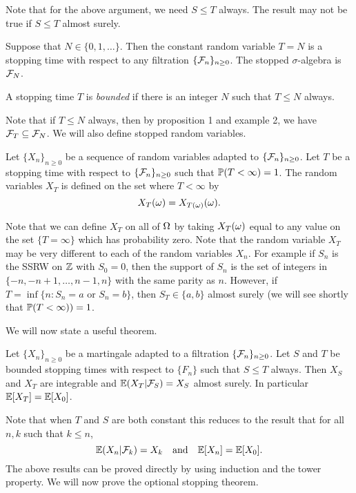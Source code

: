 Note that for the above argument, we need $S \le T$ always. The result may not be true if $S \le T$ almost surely.
\begin{example}
    Suppose that $N \in \{0,1,\ldots\}$. Then the constant random variable $T=N$ is a stopping time with respect to any filtration $\{{\mathcal{F}}_n\}_{n \ge 0}$. The stopped $\sigma$-algebra is ${\mathcal{F}}_N$. 
\end{example}
\begin{definition}
    A stopping time $T$ is \emph{bounded} if there is an integer $N$ such that $T \le N$ always.
\end{definition}
Note that if $T \le N$ always, then by proposition 1 and example 2, we have ${\mathcal{F}}_T \subseteq {\mathcal{F}}_N$. We will also define stopped random variables.
\begin{definition}
    Let $\{X_n\}_{n \ge 0}$ be a sequence of random variables adapted to $\{{\mathcal{F}}_n\}_{n \ge 0}$. Let $T$ be a stopping time with respect to $\{{\mathcal{F}}_n\}_{n \ge 0}$ such that ${\mathbb{P}}(T < \infty) = 1$. The random variables $X_T$ is defined on the set where $T < \infty$ by
    \[X_T({\omega})=X_{T({\omega})}({\omega}).\]
\end{definition}
Note that we can define $X_T$ on all of ${{\Omega}}$ by taking $X_T({\omega})$ equal to any value on the set $\{T=\infty\}$ which has probability zero. Note that the random variable $X_T$ may be very different to each of the random variables $X_n$. For example if $S_n$ is the SSRW on ${{\mathbb Z}}$ with $S_0 = 0$, then the support of $S_n$ is the set of integers in $\{-n,-n+1,\ldots, n-1,n\}$ with the same parity as $n$. However, if $T = \inf\{n : S_n = a \text{ or } S_n =b\}$, then $S_T \in \{a,b\}$ almost surely (we will see shortly that ${\mathbb{P}}(T < \infty))=1$. 

We will now state a useful theorem.

\begin{theorem}
    Let $\{X_n\}_{n \ge 0}$ be a martingale adapted to a filtration $\{{\mathcal{F}}_n\}_{n \ge 0}$. Let $S$ and $T$ be bounded stopping times with respect to $\{F_n\}$ such that $S \le T$ always. Then $X_S$ and $X_T$ are integrable and ${\mathbb{E}}(X_T|{\mathcal{F}}_S) = X_S$ almost surely. In particular ${\mathbb{E}}[X_T]={\mathbb{E}}[X_0]$.
\end{theorem}
Note that when $T$ and $S$ are both constant this reduces to the result that for all $n,k$ such that $k \le n$,
\[{\mathbb{E}}(X_n|{\mathcal{F}}_k) =X_k ~~\text{ and }~~{\mathbb{E}}[X_n]={\mathbb{E}}[X_0].\]
The above results can be proved directly by using induction and the tower property. We will now prove the optional stopping theorem.


